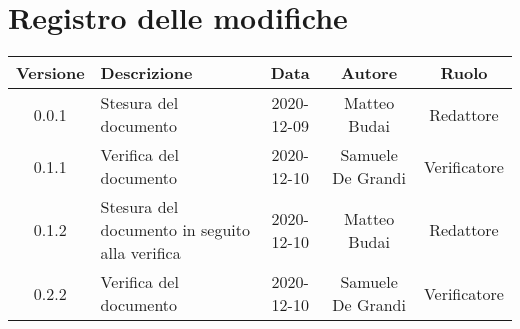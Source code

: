 \section*{Registro delle modifiche}

\begin{center}
	\begin{longtable}{|c|p{5cm}|c|c|c|}
	\hline
	\rowcolor{lighter-grayer}
	\textbf{Versione} & \textbf{Descrizione} & \textbf{Data} & \textbf{Autore} & \textbf{Ruolo} \\
	\hline
	\endfirsthead


		\hline
	0.0.1 & Stesura del documento & 2020-12-09 & Matteo Budai & Redattore \\
	\hline
	0.1.1 & Verifica del documento & 2020-12-10 & Samuele De Grandi & Verificatore \\
	\hline
	0.1.2 & Stesura del documento in seguito alla verifica & 2020-12-10 & Matteo Budai & Redattore \\
	\hline
    0.2.2 & Verifica del documento & 2020-12-10 & Samuele De Grandi & Verificatore \\
    \hline
    
	\end{longtable}
\end{center}